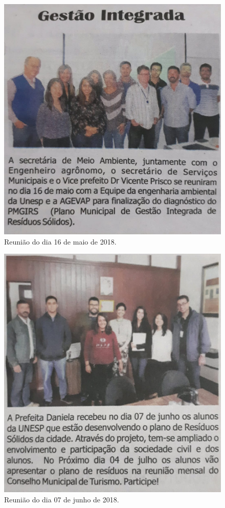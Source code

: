 \begin{figure}
	\centering
	\includegraphics[width=0.75\linewidth]{produtos/prodtres/image097}
	\caption{Reunião do dia 16 de maio de 2018.}
	\label{fig:image097}
\end{figure}

\begin{figure}
	\centering
	\includegraphics[width=0.75\linewidth]{produtos/prodtres/image098}
	\caption{Reunião do dia 07 de junho de 2018.}
	\label{fig:image098}
\end{figure}

